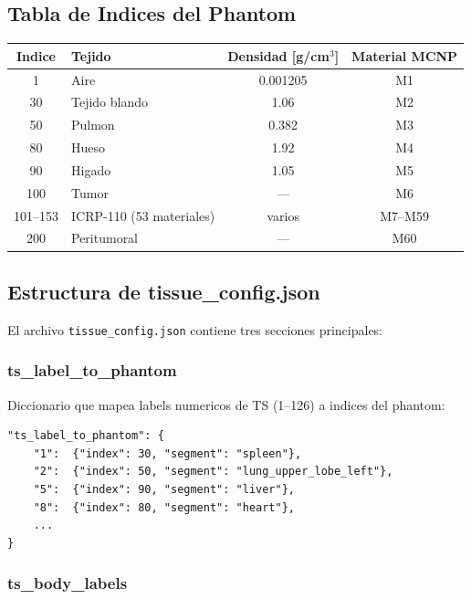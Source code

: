 \documentclass[12pt,a4paper]{article}
\begin{document}
\subsection{Tabla de Indices del Phantom}

\begin{table}[H]
\centering
\begin{tabular}{c l c c}
\toprule
\textbf{Indice} & \textbf{Tejido} & \textbf{Densidad [g/cm$^3$]} & \textbf{Material MCNP} \\
\midrule
1 & Aire & 0.001205 & M1 \\
30 & Tejido blando & 1.06 & M2 \\
50 & Pulmon & 0.382 & M3 \\
80 & Hueso & 1.92 & M4 \\
90 & Higado & 1.05 & M5 \\
100 & Tumor & --- & M6 \\
101--153 & ICRP-110 (53 materiales) & varios & M7--M59 \\
200 & Peritumoral & --- & M60 \\
\bottomrule
\end{tabular}
\end{table}

\subsection{Estructura de tissue\_config.json}

El archivo \texttt{tissue\_config.json} contiene tres secciones principales:

\subsubsection{ts\_label\_to\_phantom}

Diccionario que mapea labels numericos de TS (1--126) a indices del phantom:

\begin{verbatim}
"ts_label_to_phantom": {
    "1":  {"index": 30, "segment": "spleen"},
    "2":  {"index": 50, "segment": "lung_upper_lobe_left"},
    "5":  {"index": 90, "segment": "liver"},
    "8":  {"index": 80, "segment": "heart"},
    ...
}
\end{verbatim}

\subsubsection{ts\_body\_labels}
\end{document}
